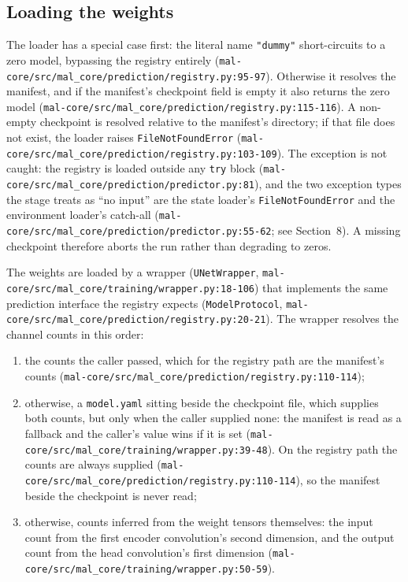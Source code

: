 \documentclass[11pt,a4paper]{article}
\newcommand{\code}[1]{\texttt{#1}}
\begin{document}
\subsection{Loading the weights}

The loader has a special case first: the literal name \code{"dummy"}
short-circuits to a zero model, bypassing the registry entirely
(\code{mal-core/src/mal\_core/prediction/registry.py:95-97}). Otherwise it
resolves the manifest, and if the manifest's checkpoint field is empty it
also returns the zero model
(\code{mal-core/src/mal\_core/prediction/registry.py:115-116}). A non-empty
checkpoint is resolved relative to the manifest's directory; if that file
does not exist, the loader raises \code{FileNotFoundError}
(\code{mal-core/src/mal\_core/prediction/registry.py:103-109}). The exception
is not caught: the registry is loaded outside any \code{try} block
(\code{mal-core/src/mal\_core/prediction/predictor.py:81}), and the two
exception types the stage treats as ``no input'' are the state loader's
\code{FileNotFoundError} and the environment loader's catch-all
(\code{mal-core/src/mal\_core/prediction/predictor.py:55-62}; see
Section~8). A missing checkpoint therefore aborts the run rather than
degrading to zeros.

The weights are loaded by a wrapper (\code{UNetWrapper},
\code{mal-core/src/mal\_core/training/wrapper.py:18-106}) that implements the
same prediction interface the registry expects
(\code{ModelProtocol}, \code{mal-core/src/mal\_core/prediction/registry.py:20-21}).
The wrapper resolves the channel counts in this order:

\begin{enumerate}
\item the counts the caller passed, which for the registry path are the
  manifest's counts
  (\code{mal-core/src/mal\_core/prediction/registry.py:110-114});
\item otherwise, a \code{model.yaml} sitting beside the checkpoint file,
  which supplies both counts, but only when the caller supplied none: the
  manifest is read as a fallback and the caller's value wins if it is set
  (\code{mal-core/src/mal\_core/training/wrapper.py:39-48}). On the registry
  path the counts are always supplied
  (\code{mal-core/src/mal\_core/prediction/registry.py:110-114}), so the
  manifest beside the checkpoint is never read;
\item otherwise, counts inferred from the weight tensors themselves: the
  input count from the first encoder convolution's second dimension, and the
  output count from the head convolution's first dimension
  (\code{mal-core/src/mal\_core/training/wrapper.py:50-59}).
\end{enumerate}
\end{document}
